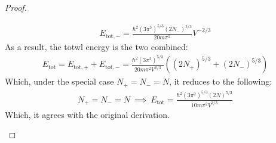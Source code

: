 \documentclass{article}
\begin{document}
\begin{proof}
\begin{itemize}
        \begin{align}
            E_{\text{tot},-} = \frac{\hbar^2(3\pi^2)^{5/3}(2N_-)^{5/3}}{20m\pi^2}V^{-2/3}
        \end{align}
        As a result, the totwl energy is the two combined:
        \begin{align}
            E_\text{tot} = E_{\text{tot},+}+E_{\text{tot},-}=\frac{\hbar^2(3\pi^2)^{5/3}}{20m\pi^2V^{2/3}}((2N_+)^{5/3}+(2N_-)^{5/3})
        \end{align}
        Which, under the special case $N_+=N_-=N$, it reduces to the following:
        \begin{align}
            N_+=N_-=N\ \implies\ E_\text{tot} = \frac{\hbar^2(3\pi^2)^{5/3}(2N)^{5/3}}{10m\pi^2 V^{2/3}}
        \end{align}
        Which, it agrees with the original derivation.
        
        \hfil


\end{itemize}
\end{proof}
\end{document}
